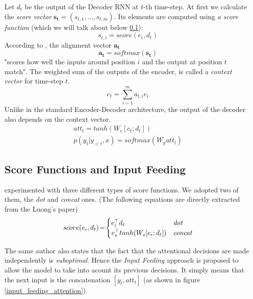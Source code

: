 Let $d_t$ be the output of the Decoder RNN at $t$-th time-step. At first we calculate the \emph{score vector} $\boldsymbol{s_t} = (s_{t,1},\dots,s_{t,m})$. Its elements are computed using \emph{a score function} (which we will talk about below \ref{score_input_feeding}):
\begin{equation}
    s_{t,i} = score(e_i, d_t)
\end{equation}
According to \citep{bahdanau2016neural}, the alignment vector $\boldsymbol{a_t}$
\begin{equation}
    \boldsymbol{a_t} = softmax(\boldsymbol{s_t})
\end{equation}
"scores how well the inputs around position $i$ and the output at position $t$ match". The weighted sum of the outputs of the encoder, is called a \emph{context vector} for time-step $t$.
\begin{equation}
    c_t = \sum_{i=1}^m{a_{t,i}e_i}
\end{equation}
Unlike in the standard Encoder-Decoder architecture, the output of the decoder also depends on the  context vector.
\begin{gather}
    att_t = tanh(W_c[c_t;d_t]) \\
    p(y_t | y_{<t}, x)= softmax(W_y att_t)
\end{gather}

\subsection{Score Functions and Input Feeding} \label{score_input_feeding}
\citep{luong2015effective} experimented with three different types of score functions. We adopted two of them, the \emph{dot} and \emph{concat} ones. (The following equations are directly extracted from the Luong's paper)
\begin{equation*}
score(e_i, d_t)\!=\!\begin{cases}
    e_i^\top d_t & \mbox{{\it dot}}\\
    v_s^\top tanh(W_s[e_i ; d_t]) & \mbox{{\it concat}}
\end{cases}
\end{equation*}

The same author also states that the fact that the attentional decisions are made independently is \emph{suboptimal}. Hence the \emph{Input Feeding} approach is proposed to allow the model to take into acount its previous decisions. It simply means that the next input is the concatenation $[y_t, att_t]$ (as shown in figure \ref{input_feeding_attention}).

